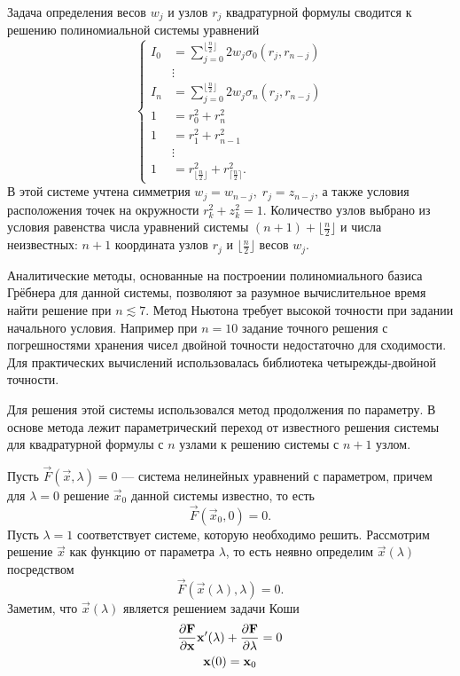 Задача определения весов $w_j$ и узлов $r_j$ квадратурной формулы сводится к решению полиномиальной системы уравнений
\begin{equation}
\begin{cases}
I_0 &= \sum_{j=0}^{\lfloor \frac{n}{2} \rfloor} 2 w_j \sigma_0(r_j, r_{n - j})\\
&\vdots\\
I_n &= \sum_{j=0}^{\lfloor \frac{n}{2} \rfloor} 2 w_j \sigma_n(r_j, r_{n - j})\\
1 &= r_0^2 + r_n^2\\
1 &= r_1^2 + r_{n-1}^2\\
& \vdots\\
1 &= r_{\lfloor \frac{n}{2} \rfloor}^2 + r_{\lceil \frac{n}{2} \rceil}^2.
\end{cases}
\label{eq:polysys}
\end{equation}
В этой системе учтена симметрия $w_j = w_{n-j},\; r_j = z_{n-j}$, а также условия расположения точек на окружности $r_k^2 + z_k^2 = 1$. Количество узлов выбрано из условия равенства числа уравнений системы $(n + 1) + \lfloor \frac{n}{2} \rfloor$ и числа неизвестных: $n+1$ координата узлов $r_j$ и $ \lfloor \frac{n}{2} \rfloor$ весов $w_j$.

Аналитические методы, основанные на построении полиномиального базиса Грёбнера \cite{Buchberger1985} для данной системы, позволяют за разумное вычислительное время найти решение при $n \lesssim 7$. Метод Ньютона требует высокой точности при задании начального условия. Например при $n = 10$ задание точного решения с погрешностями хранения чисел двойной точности недостаточно для сходимости. Для практических вычислений использовалась библиотека \cite{hida2001} четырежды-двойной точности.

Для решения этой системы использовался метод продолжения по параметру. В основе метода лежит параметрический переход от известного решения системы для квадратурной формулы с $n$ узлами к решению системы с $n+1$ узлом.

Пусть $\vec F(\vec x, \lambda) = 0$ --- система нелинейных уравнений с параметром, причем для $\lambda = 0$ решение $\vec x_0$ данной системы известно, то есть
\[
\vec F(\vec x_0, 0) = 0.
\]
Пусть $\lambda = 1$ соответствует системе, которую необходимо решить. Рассмотрим решение $\vec x$ как функцию от параметра $\lambda$, то есть неявно определим $\vec x(\lambda)$ посредством
\[
\vec F(\vec x(\lambda), \lambda) = 0.
\]
Заметим, что $\vec x(\lambda)$ является решением задачи Коши
\begin{gather*}
\frac{\partial \boldsymbol{\mathbf{F}}}{\partial \boldsymbol{\mathbf{x}}} \boldsymbol{\mathbf{x}}'(\lambda) + \frac{\partial \boldsymbol{\mathbf{F}}}{\partial \lambda} = 0\\
\boldsymbol{\mathbf{x}}(0) = \boldsymbol{\mathbf{x}}_0
\end{gather*}

